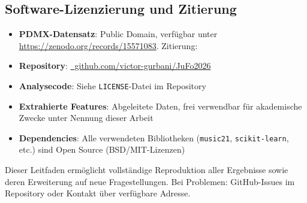 \documentclass[12pt,a4paper]{article}
\theoremstyle{definition}
\begin{document}
\subsection{Software-Lizenzierung und Zitierung}

\begin{itemize}
    \item \textbf{PDMX-Datensatz}: Public Domain, verfügbar unter \url{https://zenodo.org/records/15571083}. Zitierung: \cite{PDMX2024}
    \item \textbf{Repository}: \href{https://github.com/victor-gurbani/JuFo2026/}{\faGithub\ github.com/victor-gurbani/JuFo2026}
    \item \textbf{Analysecode}: Siehe \texttt{LICENSE}-Datei im Repository
    \item \textbf{Extrahierte Features}: Abgeleitete Daten, frei verwendbar für akademische Zwecke unter Nennung dieser Arbeit
    \item \textbf{Dependencies}: Alle verwendeten Bibliotheken (\texttt{music21}, \texttt{scikit-learn}, etc.) sind Open Source (BSD/MIT-Lizenzen)
\end{itemize}

Dieser Leitfaden ermöglicht vollständige Reproduktion aller Ergebnisse sowie deren Erweiterung auf neue Fragestellungen. Bei Problemen: GitHub-Issues im Repository oder Kontakt über verfügbare Adresse.
\end{document}
